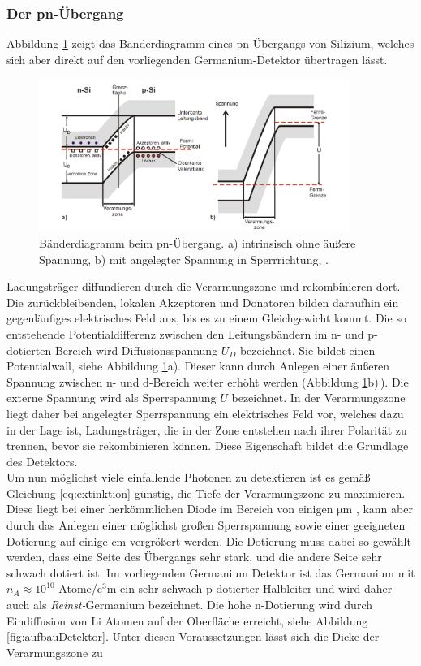 \subsubsection{Der pn-Übergang}
\label{sec:pn}
Abbildung \ref{fig:pn} zeigt das Bänderdiagramm eines pn-Übergangs von Silizium, welches sich aber direkt auf den vorliegenden Germanium-Detektor übertragen lässt.
\begin{figure}
  \centering
  \includegraphics[width=0.9\textwidth]{ressources/pn.png}
  \caption{Bänderdiagramm beim pn-Übergang. a) intrinsisch ohne äußere Spannung, b) mit angelegter Spannung in Sperrrichtung, \cite{skript}.}
  \label{fig:pn}
\end{figure}
Ladungsträger diffundieren durch die Verarmungszone und rekombinieren dort. Die zurückbleibenden, lokalen Akzeptoren und Donatoren bilden daraufhin ein gegenläufiges elektrisches Feld aus, bis es zu einem Gleichgewicht kommt. Die so entstehende Potentialdifferenz zwischen den Leitungsbändern im n- und p-dotierten Bereich wird Diffusionsspannung $U_D$ bezeichnet. Sie bildet einen Potentialwall, siehe Abbildung \ref{fig:pn}a). Dieser kann durch Anlegen einer äußeren Spannung zwischen n- und d-Bereich weiter erhöht werden (Abbildung \ref{fig:pn}b)$\,$). Die externe Spannung wird als Sperrspannung $U$ bezeichnet. In der Verarmungszone liegt daher bei angelegter Sperrspannung ein elektrisches Feld vor, welches dazu in der Lage ist, Ladungsträger, die in der Zone entstehen nach ihrer Polarität zu trennen, bevor sie rekombinieren können. Diese Eigenschaft bildet die Grundlage des Detektors. \\
Um nun möglichst viele einfallende Photonen zu detektieren ist es gemäß Gleichung \eqref{eq:extinktion} günstig, die Tiefe der Verarmungszone zu maximieren. Diese liegt bei einer herkömmlichen Diode im Bereich von einigen $\si{\micro\meter}$ \cite{skript}, kann aber durch das Anlegen einer möglichst großen Sperrspannung sowie einer geeigneten Dotierung auf einige $\si{\centi\meter}$ vergrößert werden. Die Dotierung muss dabei so gewählt werden, dass eine Seite des Übergangs sehr stark, und die andere Seite sehr schwach dotiert ist. Im vorliegenden Germanium Detektor ist das Germanium mit $n_A\approx 10^{10}$ Atome/$\si{\cubic\centi\meter}$ ein sehr schwach p-dotierter Halbleiter und wird daher auch als \emph{Reinst-}Germanium bezeichnet. Die hohe n-Dotierung wird durch Eindiffusion von Li Atomen auf der Oberfläche erreicht, siehe Abbildung \ref{fig:aufbauDetektor}. Unter diesen Voraussetzungen lässt sich die Dicke der Verarmungszone zu
